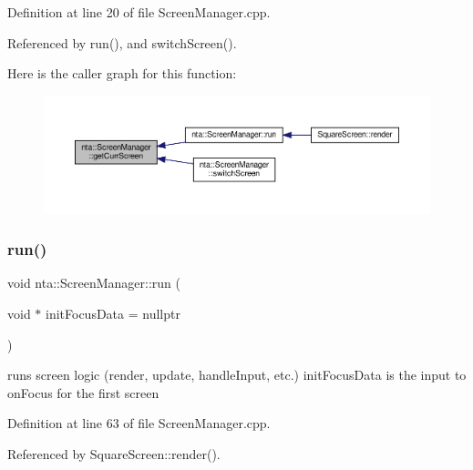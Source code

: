 Definition at line 20 of file Screen\+Manager.\+cpp.



Referenced by run(), and switch\+Screen().

Here is the caller graph for this function\+:\nopagebreak
\begin{figure}[H]
\begin{center}
\leavevmode
\includegraphics[width=350pt]{d0/dc4/classnta_1_1ScreenManager_a4b26e8adc481bfb37a088e047e4ccc2a_icgraph}
\end{center}
\end{figure}
\mbox{\label{classnta_1_1ScreenManager_ad20be92778255ff1527e84bb8e54abe3}} 
\subsubsection{\texorpdfstring{run()}{run()}}
{\footnotesize\ttfamily void nta\+::\+Screen\+Manager\+::run (\begin{DoxyParamCaption}\item[{void $\ast$}]{init\+Focus\+Data = {\ttfamily nullptr} }\end{DoxyParamCaption})}

runs screen logic (render, update, handle\+Input, etc.) init\+Focus\+Data is the input to on\+Focus for the first screen 

Definition at line 63 of file Screen\+Manager.\+cpp.



Referenced by Square\+Screen\+::render().

